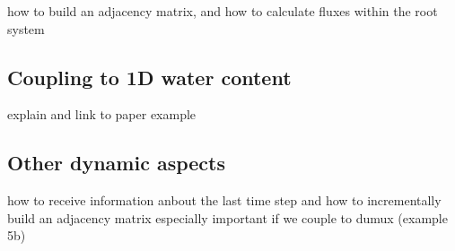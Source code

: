 \documentclass[a4paper]{article}
\begin{document}
how to build an adjacency matrix, and how to calculate fluxes within the root system



\subsection{Coupling to 1D water content}

explain and link to paper example

\subsection{Other dynamic aspects}

how to receive information anbout the last time step and 
how to incrementally build an adjacency matrix
especially important if we couple to dumux (example 5b)









\end{document}
